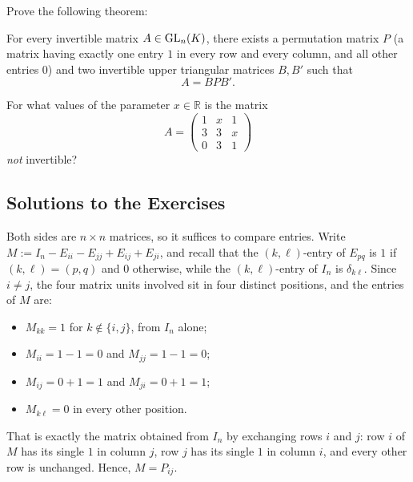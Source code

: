 \begin{exercise}
\label{exc:bruhat_decomposition}
Prove the following theorem:
\begin{theorem*}
For every invertible matrix $A \in \operatorname{GL}_n(K)$, there exists a permutation matrix $P$ (a matrix having exactly one entry $1$ in every row and every column, and all other entries $0$) and two invertible upper triangular matrices $B, B'$ such that
\[
A = B P B'.
\]
\end{theorem*}
\end{exercise}

\begin{exercise}
\label{exc:parametric_3x3_invertibility_mc}
For what values of the parameter $x \in \mathbb{R}$ is the matrix
\[
A = \begin{pmatrix} 1 & x & 1 \\ 3 & 3 & x \\ 0 & 3 & 1 \end{pmatrix}
\]
\emph{not} invertible?
\end{exercise}

\subsection{Solutions to the Exercises}
\label{sec:solutions_eros_revisited}

\begin{exercisesolution}
\label{sol:permutation_matrix_form}
Both sides are $n \times n$ matrices, so it suffices to compare entries. Write $M := I_n - E_{ii} - E_{jj} + E_{ij} + E_{ji}$, and recall that the $(k,\ell)$-entry of $E_{pq}$ is $1$ if $(k,\ell) = (p,q)$ and $0$ otherwise, while the $(k,\ell)$-entry of $I_n$ is $\delta_{k\ell}$. Since $i \neq j$, the four matrix units involved sit in four distinct positions, and the entries of $M$ are:
\begin{itemize}
    \item $M_{kk} = 1$ for $k \notin \{i, j\}$, from $I_n$ alone;
    \item $M_{ii} = 1 - 1 = 0$ and $M_{jj} = 1 - 1 = 0$;
    \item $M_{ij} = 0 + 1 = 1$ and $M_{ji} = 0 + 1 = 1$;
    \item $M_{k\ell} = 0$ in every other position.
\end{itemize}
That is exactly the matrix obtained from $I_n$ by exchanging rows $i$ and $j$: row $i$ of $M$ has its single $1$ in column $j$, row $j$ has its single $1$ in column $i$, and every other row is unchanged. Hence, $M = P_{ij}$.
\end{exercisesolution}

